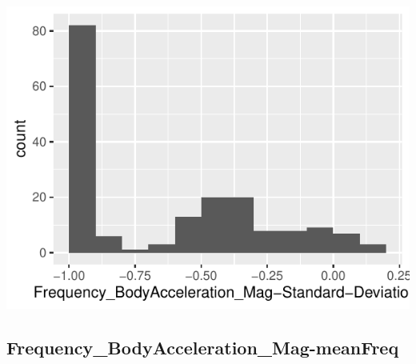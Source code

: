 \documentclass[
]{article}
\begin{document}
\begin{minipage}{0.25 \textwidth}

\includegraphics{codebook_tidydatasub_files/figure-latex/Var-71-Frequency-BodyAcceleration-Mag-Standard-Deviation--1.pdf}

\end{minipage}

\noindent\makebox[\linewidth]{\rule{\textwidth}{0.4pt}}

\hypertarget{frequency_bodyacceleration_mag-meanfreq}{%
\subsection{Frequency\_BodyAcceleration\_Mag-meanFreq}\label{frequency_bodyacceleration_mag-meanfreq}}
\end{document}

